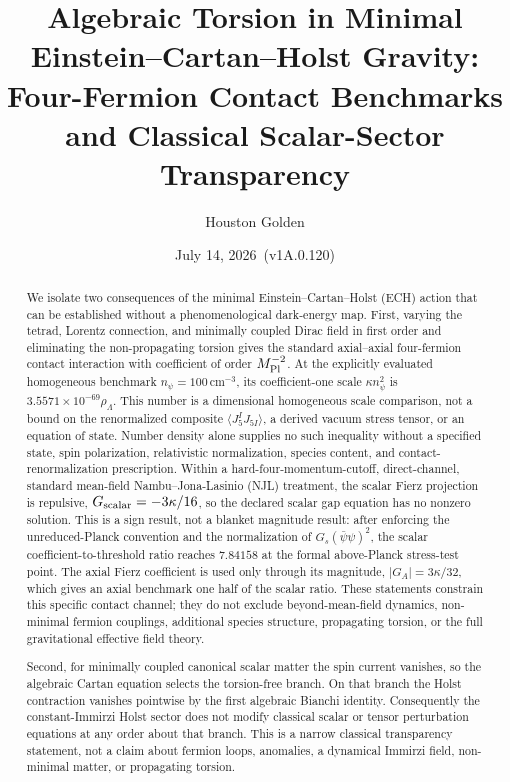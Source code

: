 \documentclass[aps,prd,twocolumn,superscriptaddress,showpacs,preprintnumbers,nofootinbib,longbibliography,floatfix]{revtex4-2}
\newcommand{\paperVersion}{v1A.0.120}
\newcommand{\paperTimestamp}{July 14, 2026}
\begin{document}

\title{Algebraic Torsion in Minimal Einstein--Cartan--Holst Gravity:\\
Four-Fermion Contact Benchmarks and Classical Scalar-Sector Transparency}

\author{Houston Golden}

\date{\paperTimestamp\ (\paperVersion)}

\begin{abstract}
We isolate two consequences of the minimal Einstein--Cartan--Holst (ECH)
action that can be established without a phenomenological dark-energy map.
First, varying the tetrad, Lorentz connection, and minimally coupled Dirac
field in first order and eliminating the non-propagating torsion gives the
standard axial--axial four-fermion contact interaction with coefficient of
order $M_{\rm Pl}^{-2}$.  At the explicitly evaluated homogeneous benchmark
$n_\psi=100\,\mathrm{cm}^{-3}$, its coefficient-one scale
$\kappa n_\psi^2$ is $3.5571\times10^{-69}\rho_\Lambda$.  This number is a
dimensional homogeneous scale comparison, not a bound on the renormalized
composite $\langle J_5^I J_{5I}\rangle$, a derived vacuum stress tensor, or
an equation of state.  Number density alone supplies no such inequality
without a specified state, spin polarization, relativistic normalization,
species content, and contact-renormalization prescription.  Within a
hard-four-momentum-cutoff, direct-channel, standard mean-field
Nambu--Jona-Lasinio (NJL) treatment, the scalar Fierz projection is repulsive,
$G_{\rm scalar}=-3\kappa/16$, so the declared scalar gap equation has no
nonzero solution.  This is a sign result, not a blanket magnitude result:
after enforcing the unreduced-Planck convention and the normalization of
$G_s(\bar\psi\psi)^2$, the scalar coefficient-to-threshold ratio reaches
$7.84158$ at the formal above-Planck stress-test point.  The axial Fierz
coefficient is used only through its magnitude, $|G_A|=3\kappa/32$, which gives
an axial benchmark one half of the scalar ratio.  These statements constrain
this specific contact channel; they do not exclude beyond-mean-field dynamics,
non-minimal fermion couplings, additional species structure, propagating
torsion, or the full gravitational effective field theory.

Second, for minimally coupled canonical scalar matter the spin current
vanishes, so the algebraic Cartan equation selects the torsion-free branch.
On that branch the Holst contraction vanishes pointwise by the first
algebraic Bianchi identity.  Consequently the constant-Immirzi Holst sector
does not modify classical scalar or tensor perturbation equations at any
order about that branch.  This is a narrow classical transparency statement,
not a claim about fermion loops, anomalies, a dynamical Immirzi field,
non-minimal matter, or propagating torsion.


\end{abstract}
\end{document}
